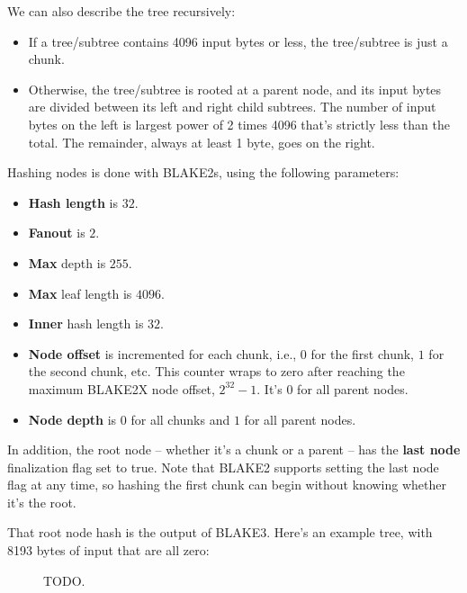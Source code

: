 \documentclass[11pt,notitlepage,a4paper]{article}
\begin{document}
We can also describe the tree recursively:
\begin{itemize}
\item If a tree/subtree contains 4096 input bytes or less, the tree/subtree is just a chunk.
\item Otherwise, the tree/subtree is rooted at a parent node, and its input bytes are divided between its left and right child subtrees. The number of input bytes on the left is largest power of 2 times 4096 that's strictly less than the total. The remainder, always at least 1 byte, goes on the right.
\end{itemize}

Hashing nodes is done with BLAKE2s, using the following parameters:
\begin{itemize}
\item \textbf{Hash length} is $32$.
\item \textbf{Fanout} is $2$.
\item \textbf{Max} depth is $255$.
\item \textbf{Max} leaf length is $4096$.
\item \textbf{Inner} hash length is $32$.
\item \textbf{Node offset} is incremented for each chunk, i.e., $0$ for the first chunk, $1$ for the second chunk, etc. This counter wraps to zero after reaching the maximum BLAKE2X node offset, $2^{32}-1$. It's $0$ for all parent nodes.
\item \textbf{Node depth} is $0$ for all chunks and $1$ for all parent nodes.
\end{itemize}
In addition, the root node -- whether it's a chunk or a parent -- has the \textbf{last node} finalization flag set to true. Note that BLAKE2 supports setting the last node flag at any time, so hashing the first chunk can begin without knowing whether it's the root.

That root node hash is the output of BLAKE3. Here's an example tree, with 8193 bytes of input that are all zero:
\begin{figure}[h]
\centering
TODO.
\end{figure}
\end{document}
